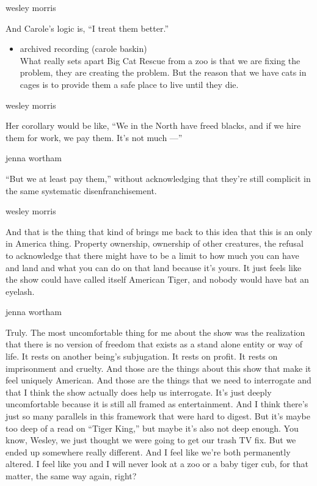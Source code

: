 wesley morris

And Carole's logic is, ``I treat them better.''

\begin{itemize}
\tightlist
\item
  archived recording (carole baskin)\\
  What really sets apart Big Cat Rescue from a zoo is that we are fixing
  the problem, they are creating the problem. But the reason that we
  have cats in cages is to provide them a safe place to live until they
  die.
\end{itemize}

wesley morris

Her corollary would be like, ``We in the North have freed blacks, and if
we hire them for work, we pay them. It's not much ---''

jenna wortham

``But we at least pay them,'' without acknowledging that they're still
complicit in the same systematic disenfranchisement.

wesley morris

And that is the thing that kind of brings me back to this idea that this
is an only in America thing. Property ownership, ownership of other
creatures, the refusal to acknowledge that there might have to be a
limit to how much you can have and land and what you can do on that land
because it's yours. It just feels like the show could have called itself
American Tiger, and nobody would have bat an eyelash.

jenna wortham

Truly. The most uncomfortable thing for me about the show was the
realization that there is no version of freedom that exists as a stand
alone entity or way of life. It rests on another being's subjugation. It
rests on profit. It rests on imprisonment and cruelty. And those are the
things about this show that make it feel uniquely American. And those
are the things that we need to interrogate and that I think the show
actually does help us interrogate. It's just deeply uncomfortable
because it is still all framed as entertainment. And I think there's
just so many parallels in this framework that were hard to digest. But
it's maybe too deep of a read on ``Tiger King,'' but maybe it's also not
deep enough. You know, Wesley, we just thought we were going to get our
trash TV fix. But we ended up somewhere really different. And I feel
like we're both permanently altered. I feel like you and I will never
look at a zoo or a baby tiger cub, for that matter, the same way again,
right?

